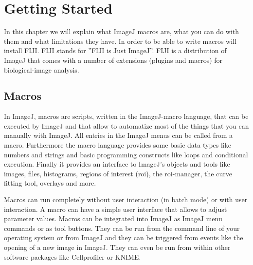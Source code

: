 \chapter{Getting Started}

In this chapter we will explain what ImageJ macros are, what you can do with them and what limitations they have. In order to be able to write macros will install FIJI. FIJI\cite{schindelin_fiji:_2012} stands for ''FIJI is Just ImageJ''. FIJI is a distribution of ImageJ that comes with a number of extensions (plugins and macros) for biological-image analysis. 

\section{Macros}

In ImageJ, macros are scripts, written in the ImageJ-macro language\cite{mutterer_macro_2010}, that can be executed by ImageJ and that allow to automatize most of the things that you can manually with ImageJ. All entries in the ImageJ menus can be called from a macro. Furthermore the macro language provides some basic data types like numbers and strings and basic programming constructs like loops and conditional execution. Finally it provides an interface to ImageJ's objects and tools like images, files, histograms, regions of interest (roi), the roi-manager, the curve fitting tool, overlays and more. 

Macros can run completely without user interaction (in batch mode) or with user interaction. A macro can have a simple user interface that allows to adjust parameter values. Macros can be integrated into ImageJ as ImageJ menu commands or as tool buttons. They can be run from the command line of your operating system or from ImageJ and they can be triggered from events like the opening of a new image in ImageJ. They can even be run from within other software packages like Cellprofiler\cite{lamprecht_cellprofiler:_2007} or KNIME\cite{berthold_knime_2009}.

